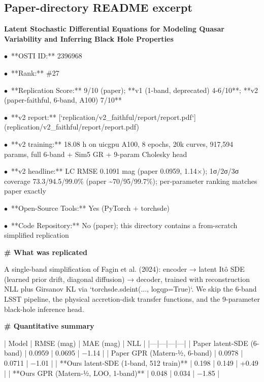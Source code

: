 \documentclass[11pt]{article}
\begin{document}
\subsection*{Paper-directory README excerpt}
\small
\par\medskip\textbf{Latent Stochastic Differential Equations for Modeling Quasar Variability and Inferring Black Hole Properties}\par
\par$\bullet$\ **OSTI ID:** 2396968
\par$\bullet$\ **Rank:** \#27
\par$\bullet$\ **Replication Score:** 9/10 (paper); **v1 (1-band, deprecated) 4-6/10**; **v2 (paper-faithful, 6-band, A100) 7/10**
\par$\bullet$\ **v2 report:** [`replication/v2\_faithful/report/report.pdf`](replication/v2\_faithful/report/report.pdf)
\par$\bullet$\ **v2 training:** 18.08 h on uicgpu A100, 8 epochs, 20k curves, 917,594 params, full 6-band + Sim5 GR + 9-param Cholesky head
\par$\bullet$\ **v2 headline:** LC RMSE 0.1091 mag (paper 0.0959, 1.14×); 1σ/2σ/3σ coverage 73.3/94.5/99.0\% (paper \textasciitilde{}70/95/99.7\%); per-parameter ranking matches paper exactly
\par$\bullet$\ **Open-Source Tools:** Yes (PyTorch + torchsde)
\par$\bullet$\ **Code Repository:** No (paper); this directory contains a from-scratch simplified replication

\par\medskip\textbf{\# What was replicated}\par

A single-band simplification of Fagin et al. (2024): encoder → latent Itô SDE (learned prior drift,
diagonal diffusion) → decoder, trained with reconstruction NLL plus Girsanov KL via
`torchsde.sdeint(..., logqp=True)`. We skip the 6-band LSST pipeline, the physical accretion-disk
transfer functions, and the 9-parameter black-hole inference head.

\par\medskip\textbf{\# Quantitative summary}\par

| Model | RMSE (mag) | MAE (mag) | NLL |
|---|---|---|---|
| Paper latent-SDE (6-band) | 0.0959 | 0.0695 | −1.14 |
| Paper GPR (Matern-½, 6-band) | 0.0978 | 0.0711 | −1.01 |
| **Ours latent-SDE (1-band, 512 train)** | 0.198 | 0.149 | +0.49 |
| **Ours GPR (Matern-½, LOO, 1-band)** | 0.048 | 0.034 | −1.85 |
\end{document}
